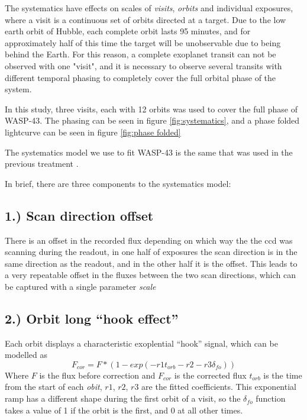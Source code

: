 \documentclass[a4paper,fleqn,usenatbib]{mnras}
\begin{document}
The systematics have effects on scales of \emph{visits}, \emph{orbits} and individual exposures, where a visit is a continuous set of orbits directed at a target. Due to the low earth orbit of Hubble, each complete orbit lasts 95 minutes, and for approximately half of this time the target will be unobservable due to being behind the Earth. For this reason, a complete exoplanet transit can not be observed with one "visit", and it is necessary to observe several transits with different temporal phasing to completely cover the full orbital phase of the system.

In this study, three visits, each with 12 orbits was used to cover the full phase of WASP-43. The phasing can be seen in figure \ref{fig:systematics}, and a phase folded lightcurve can be seen in figure \ref{fig:phase folded}

The systematics model we use to fit WASP-43 is the same that was used in the previous treatment \citep{Stevenson2014}.

In brief, there are three components to the systematics model:
\subsection*{1.) Scan direction offset}

There is an offset in the recorded flux depending on which way the the ccd was scanning during the readout, in one half of exposures the scan direction is in the same direction as the readout, and in the other half it is the offset. This leads to a very repeatable offset in the fluxes between the two scan directions, which can be captured with a single parameter \emph{scale}

\subsection*{2.) Orbit long ``hook effect''}

Each orbit displays a characteristic exoplential ``hook'' signal, which can be modelled as
\begin{equation} \label{eq:hook}
F_{cor} = F*(1-exp(-r1 t_{orb}-r2-r3 \delta_{fo}))
\end{equation}
Where $F$ is the flux before correction and $F_{cor}$ is the corrected flux $t_{orb}$ is the time from the start of each \emph{obit}, $r1$, $r2$, $r3$ are the fitted coefficients. This exponential ramp has a different shape during the first orbit of a visit, so the $\delta_{fo}$ function takes a value of 1 if the orbit is the first, and 0 at all other times.
\end{document}
